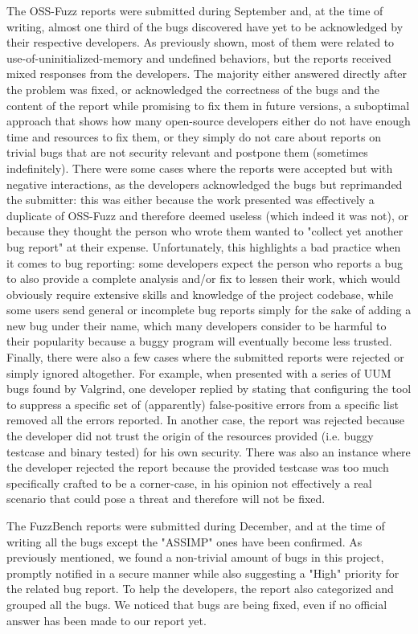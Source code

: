 The OSS-Fuzz reports were submitted during September and, at the time of writing, almost one third of the bugs discovered have yet to be acknowledged by their respective developers. 
As previously shown, most of them were related to use-of-uninitialized-memory and undefined behaviors, but the reports received mixed responses from the developers. The majority either answered directly after the problem was fixed, or acknowledged the correctness of the bugs and the content of the report while promising to fix them in future versions, a suboptimal approach that shows how many open-source developers either do not have enough time and resources to fix them, or they simply do not care about reports on trivial bugs that are not security relevant and postpone them (sometimes indefinitely). 
There were some cases where the reports were accepted but with negative interactions, as the developers acknowledged the bugs but reprimanded the submitter: this was either because the work presented was effectively a duplicate of OSS-Fuzz and therefore deemed useless (which indeed it was not), or because they thought the person who wrote them wanted to "collect yet another bug report" at their expense. Unfortunately, this highlights a bad practice when it comes to bug reporting: some developers expect the person who reports a bug to also provide a complete analysis and/or fix to lessen their work, which would obviously require extensive skills and knowledge of the project codebase, while some users send general or incomplete bug reports simply for the sake of adding a new bug under their name, which many developers consider to be harmful to their popularity because a buggy program will eventually become less trusted.
Finally, there were also a few cases where the submitted reports were rejected or simply ignored altogether. For example, when presented with a series of UUM bugs found by Valgrind, one developer replied by stating that configuring the tool to suppress a specific set of (apparently) false-positive errors from a specific list removed all the errors reported. In another case, the report was rejected because the developer did not trust the origin of the resources provided (i.e. buggy testcase and binary tested) for his own security. There was also an instance where the developer rejected the report because the provided testcase was too much specifically crafted to be a corner-case, in his opinion not effectively a real scenario that could pose a threat and therefore will not be fixed.  

The FuzzBench reports were submitted during December, and at the time of writing all the bugs except the "ASSIMP" ones have been confirmed. As previously mentioned, we found a non-trivial amount of bugs in this project, promptly notified in a secure manner while also suggesting a "High" priority for the related bug report. To help the developers, the report also categorized and grouped all the bugs. We noticed that bugs are being fixed, even if no official answer has been made to our report yet.


